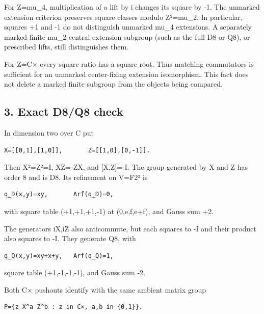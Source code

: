 For Z=mu\_4, multiplication of a lift by i changes its square by -1. The
unmarked extension criterion preserves square classes modulo Z²=mu\_2.
In particular, squares +1 and -1 do not distinguish unmarked mu\_4
extensions. A separately marked finite mu\_2-central extension subgroup
(such as the full D8 or Q8), or prescribed lifts, still distinguishes
them.

For Z=C× every square ratio has a square root. Thus matching commutators
is sufficient for an unmarked center-fixing extension isomorphism. This
fact does not delete a marked finite subgroup from the objects being
compared.

\hypertarget{dyadic_markings-exact-d8q8-check}{%
\subsection{3. Exact D8/Q8 check}\label{dyadic_markings-exact-d8q8-check}}

In dimension two over C put

\begin{Verbatim}[fontsize=\small,breaklines=true,breakanywhere=true]
X=[[0,1],[1,0]],       Z=[[1,0],[0,-1]].
\end{Verbatim}

Then X²=Z²=I, XZ=-ZX, and {[}X,Z{]}=-I. The group generated by X and Z
has order 8 and is D8. Its refinement on V=F2² is

\begin{Verbatim}[fontsize=\small,breaklines=true,breakanywhere=true]
q_D(x,y)=xy,       Arf(q_D)=0,
\end{Verbatim}

with square table (+1,+1,+1,-1) at (0,e,f,e+f), and Gauss sum +2.

The generators iX,iZ also anticommute, but each squares to -I and their
product also squares to -I. They generate Q8, with

\begin{Verbatim}[fontsize=\small,breaklines=true,breakanywhere=true]
q_Q(x,y)=xy+x+y,   Arf(q_Q)=1,
\end{Verbatim}

square table (+1,-1,-1,-1), and Gauss sum -2.

Both C× pushouts identify with the same ambient matrix group

\begin{Verbatim}[fontsize=\small,breaklines=true,breakanywhere=true]
P={z X^a Z^b : z in C×, a,b in {0,1}}.
\end{Verbatim}

